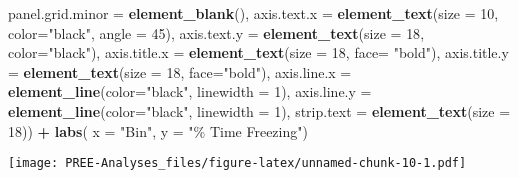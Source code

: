 \documentclass[
]{article}
\newenvironment{Shaded}{\begin{snugshade}}{\end{snugshade}}
\newcommand{\AttributeTok}[1]{\textcolor[rgb]{0.13,0.29,0.53}{#1}}
\newcommand{\DecValTok}[1]{\textcolor[rgb]{0.00,0.00,0.81}{#1}}
\newcommand{\FunctionTok}[1]{\textcolor[rgb]{0.13,0.29,0.53}{\textbf{#1}}}
\newcommand{\NormalTok}[1]{#1}
\newcommand{\SpecialCharTok}[1]{\textcolor[rgb]{0.81,0.36,0.00}{\textbf{#1}}}
\newcommand{\StringTok}[1]{\textcolor[rgb]{0.31,0.60,0.02}{#1}}
\begin{document}
\begin{Shaded}
\begin{Highlighting}[]
        \AttributeTok{panel.grid.minor =} \FunctionTok{element\_blank}\NormalTok{(),}
        \AttributeTok{axis.text.x =} \FunctionTok{element\_text}\NormalTok{(}\AttributeTok{size =} \DecValTok{10}\NormalTok{, }\AttributeTok{color=}\StringTok{"black"}\NormalTok{, }\AttributeTok{angle =} \DecValTok{45}\NormalTok{),}
        \AttributeTok{axis.text.y =} \FunctionTok{element\_text}\NormalTok{(}\AttributeTok{size =} \DecValTok{18}\NormalTok{, }\AttributeTok{color=}\StringTok{"black"}\NormalTok{),}
        \AttributeTok{axis.title.x =} \FunctionTok{element\_text}\NormalTok{(}\AttributeTok{size =} \DecValTok{18}\NormalTok{, }\AttributeTok{face=} \StringTok{"bold"}\NormalTok{),}
        \AttributeTok{axis.title.y =} \FunctionTok{element\_text}\NormalTok{(}\AttributeTok{size =} \DecValTok{18}\NormalTok{, }\AttributeTok{face=}\StringTok{"bold"}\NormalTok{),}
        \AttributeTok{axis.line.x =} \FunctionTok{element\_line}\NormalTok{(}\AttributeTok{color=}\StringTok{"black"}\NormalTok{, }\AttributeTok{linewidth =} \DecValTok{1}\NormalTok{),}
        \AttributeTok{axis.line.y =} \FunctionTok{element\_line}\NormalTok{(}\AttributeTok{color=}\StringTok{"black"}\NormalTok{, }\AttributeTok{linewidth =} \DecValTok{1}\NormalTok{),}
        \AttributeTok{strip.text =} \FunctionTok{element\_text}\NormalTok{(}\AttributeTok{size =} \DecValTok{18}\NormalTok{)) }\SpecialCharTok{+} 
  \FunctionTok{labs}\NormalTok{(}
    \AttributeTok{x =} \StringTok{"Bin"}\NormalTok{,}
    \AttributeTok{y =} \StringTok{"\% Time Freezing"}\NormalTok{)}
\end{Highlighting}
\end{Shaded}

\texttt{[image: PREE-Analyses\_files/figure-latex/unnamed-chunk-10-1.pdf]}
\end{document}
